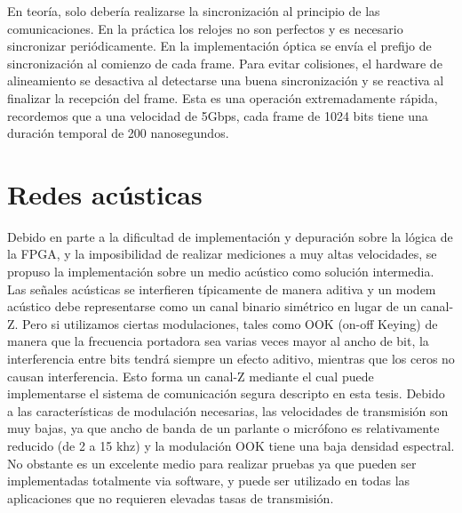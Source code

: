 En teoría, solo debería realizarse la sincronización al principio de las comunicaciones. En la práctica los relojes no son perfectos y es necesario sincronizar periódicamente. En la implementación óptica se envía el prefijo de sincronización al comienzo de cada frame.
Para evitar colisiones, el hardware de alineamiento se desactiva al detectarse una buena sincronización y se reactiva al finalizar la recepción del frame. Esta es una operación extremadamente rápida, recordemos que a una velocidad de 5Gbps, cada frame de 1024 bits tiene una duración temporal de 200 nanosegundos.

\section{Redes acústicas}
Debido en parte a la dificultad de implementación y depuración sobre la lógica de la FPGA, y la imposibilidad de realizar mediciones a muy altas velocidades, se propuso la implementación sobre un medio acústico como solución intermedia. Las señales acústicas se interfieren típicamente de manera aditiva y un modem acústico debe representarse como un canal binario simétrico en lugar de un canal-Z. Pero si utilizamos ciertas modulaciones, tales como OOK (on-off Keying) de manera que la frecuencia portadora sea varias veces mayor al ancho de bit, la interferencia entre bits tendrá siempre un efecto aditivo, mientras que los ceros no causan interferencia. Esto forma un canal-Z mediante el cual puede implementarse el sistema de comunicación segura descripto en esta tesis. Debido a las características de modulación necesarias, las velocidades de transmisión son muy bajas, ya que ancho de banda de un parlante o micrófono es relativamente reducido (de 2 a 15 khz) y la modulación OOK tiene una baja densidad espectral. 
No obstante es un excelente medio para realizar pruebas ya que pueden ser implementadas totalmente via software, y puede ser utilizado en todas las aplicaciones que no requieren elevadas tasas de transmisión.

